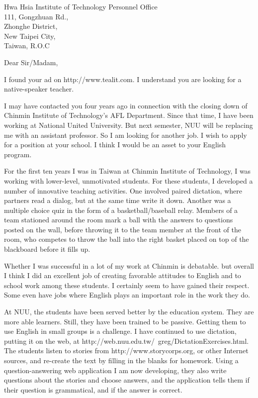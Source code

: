 \documentclass{letter}
\begin{document}
\begin{letter}{
Hwa Hsia Institute of Technology Personnel Office \\ 111, Gongzhuan Rd., \\ Zhonghe District, \\ New Taipei City, \\ Taiwan, R.O.C}
\opening{Dear Sir/Madam,}

I found your ad on http://www.tealit.com. I understand you are looking for a native-speaker teacher.

I may have contacted you four years ago in connection with the closing down of Chinmin Institute of Technology's AFL Department. Since that time, I have been working at National United University. But next semester, NUU will be replacing me with an assistant professor. So I am looking for another job. I wish to apply for a position at your school. I think I would be an asset to your English program.

For the first ten years I was in Taiwan at Chinmin Institute of Technology, I was working with lower-level, unmotivated students. For these students, I developed a number of innovative teaching activities. One involved paired dictation, where partners read a dialog, but at the same time write it down. Another was a multiple choice quiz in the form of a basketball/baseball relay. Members of a team stationed around the room mark a ball with the answers to questions posted on the wall, before throwing it to the team member at the front of the room, who competes to throw the ball into the right basket placed on top of the blackboard before it fills up.

Whether I was successful in a lot of my work at Chinmin is debatable. but overall I think I did an excellent job of creating favorable attitudes to English and to school work among these students. I certainly seem to have gained their respect. Some even have jobs where English plays an important role in the work they do.

At NUU, the students have been served better by the education system. They are more able learners. Still, they have been trained to be passive. Getting them to use English in small groups is a challenge. I have continued to use dictation, putting it on the web, at http://web.nuu.edu.tw/~greg/DictationExercises.html. The students listen to stories from http://www.storycorps.org, or other Internet sources, and re-create the text by filling in the blanks for homework. Using a question-answering web application I am now developing, they also write questions about the stories and choose answers, and the application tells them if their question is grammatical, and if the answer is correct.


\end{letter}
\end{document}
